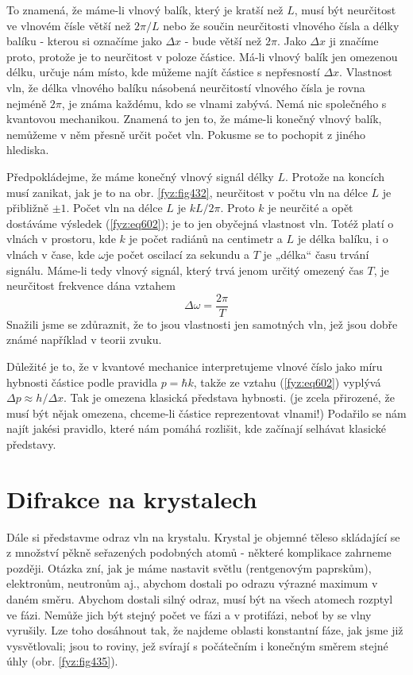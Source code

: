     To znamená, že máme-li vlnový balík, který je kratší než \(L\), musí být neurčitost ve vlnovém
    čísle větší než \(2π/L\) nebo že součin neurčitosti vlnového čísla a délky balíku - kterou si
    označíme jako \(\Delta x\) - bude větší než \(2π\). Jako \(\Delta x\)  ji značíme proto,
    protože je to neurčitost v poloze částice. Má-li vlnový balík jen omezenou délku, určuje nám
    místo, kde můžeme najít částice s nepřesností \(\Delta x\). Vlastnost vln, že délka vlnového
    balíku násobená neurčitostí vlnového čísla je rovna nejméně \(2π\), je známa každému, kdo se
    vlnami zabývá. Nemá nic společného s kvantovou mechanikou. Znamená to jen to, že máme-li konečný
    vlnový balík, nemůžeme v něm přesně určit počet vln. Pokusme se to pochopit z jiného hlediska.

    Předpokládejme, že máme konečný vlnový signál délky \(L\). Protože na koncích musí zanikat, jak
    je to na obr. \ref{fyz:fig432}, neurčitost v počtu vln na délce \(L\) je přibližně \(\pm1\).
    Počet vln na délce \(L\) je \(kL/2π\). Proto \(k\) je neurčité a opět dostáváme výsledek
    (\ref{fyz:eq602}); je to jen obyčejná vlastnost vln. Totéž platí o vlnách v prostoru, kde \(k\)
    je počet radiánů na centimetr a \(L\) je délka balíku, i o vlnách v čase, kde \(\omega\)je počet
    oscilací za sekundu a \(T\) je „délka“ času trvání signálu. Máme-li tedy vlnový signál, který
    trvá jenom určitý omezený čas \(T\), je neurčitost frekvence dána vztahem
    \begin{equation}\label{fyz:eq603}
      Δω = \frac{2π}{T}
    \end{equation} 
    Snažili jsme se zdůraznit, že to jsou vlastnosti jen samotných vln, jež jsou dobře známé
    například v teorii zvuku.

    Důležité je to, že v kvantové mechanice interpretujeme vlnové číslo jako míru hybnosti částice
    podle pravidla \(p=ℏk\), takže ze vztahu (\ref{fyz:eq602}) vyplývá \(Δp≈h/Δx\). Tak je
    omezena klasická představa hybnosti. (je zcela přirozené, že musí být nějak omezena, chceme-li
    částice reprezentovat vlnami!) Podařilo se nám najít jakési pravidlo, které nám pomáhá rozlišit,
    kde začínají selhávat klasické představy.

  \section{Difrakce na krystalech}\label{fyz:IchapXXXVIIIsecIII}
    Dále si představme odraz vln na krystalu. Krystal je objemné těleso skládající se z množství
    pěkně seřazených podobných atomů - některé komplikace zahrneme později. Otázka zní, jak je máme
    nastavit světlu (rentgenovým paprskům), elektronům, neutronům aj., abychom dostali po odrazu
    výrazné maximum v daném směru. Abychom dostali silný odraz, musí být na všech atomech rozptyl ve
    fázi. Nemůže jich být stejný počet ve fázi a v protifázi, neboť by se vlny vyrušily. Lze toho
    dosáhnout tak, že najdeme oblasti konstantní fáze, jak jsme již vysvětlovali; jsou to roviny,
    jež svírají s počátečním i konečným směrem stejné úhly (obr. \ref{fyz:fig435}). 
    
